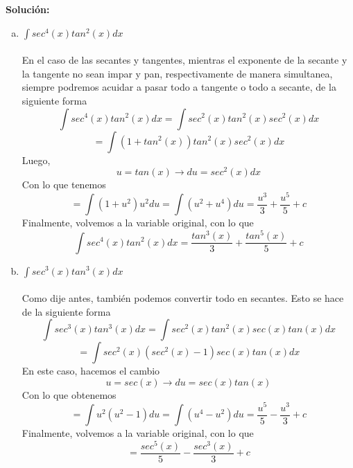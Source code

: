 \documentclass[12pt]{article}
\newenvironment{solucion}
{\begin{mdframed}[backgroundcolor=black!10]
		{\bf Solución:}\\
	}
	{
	\end{mdframed}
}
\newenvironment{preguntas}
{\begin{enumerate}\itemsep12pt
	}
	{
	\end{enumerate}
}
\newcommand{\ra}{\rightarrow}
\begin{document}
\begin{preguntas}
\begin{solucion}
\begin{enumerate}[a)]
\item $\displaystyle\int sec^4(x)tan^2(x)dx$\\\\
			En el caso de las secantes y tangentes, mientras el exponente de la secante y la tangente no sean impar y pan, respectivamente de manera simultanea, siempre podremos acuidar a pasar todo a tangente o todo a secante, de la siguiente forma
			$$\displaystyle\int sec^4(x)tan^2(x)dx
			=\displaystyle\int sec^2(x)tan^2(x)sec^2(x)dx$$
			$$=\displaystyle\int (1+tan^2(x))tan^2(x)sec^2(x)dx$$
			Luego,
			$$u = tan(x) \ra du = sec^2(x)dx$$
			Con lo que tenemos
			$$=\displaystyle\int (1+u^2)u^2du
			= \displaystyle\int (u^2+u^4)du
			= \dfrac{u^3}{3} + \dfrac{u^5}{5} + c$$
			Finalmente, volvemos a la variable original, con lo que
			$$\displaystyle\int sec^4(x)tan^2(x)dx = \dfrac{tan^3(x)}{3} + \dfrac{tan^5(x)}{5} + c$$
\item $\displaystyle\int sec^3(x)tan^3(x)dx$\\\\
			Como dije antes, también podemos convertir todo en secantes. Esto se hace de la siguiente forma
			$$\displaystyle\int sec^3(x)tan^3(x)dx
			= \displaystyle\int sec^2(x)tan^2(x)sec(x)tan(x)dx$$
			$$ = \displaystyle\int sec^2(x)(sec^2(x)-1)sec(x)tan(x)dx$$
			En este caso, hacemos el cambio
			$$u = sec(x) \ra du = sec(x)tan(x)$$
			Con lo que obtenemos
			$$ = \displaystyle\int u^2(u^2-1)du
			= \displaystyle\int (u^4-u^2)du
			= \dfrac{u^5}{5} - \dfrac{u^3}{3} + c$$
			Finalmente, volvemos a la variable original, con lo que
			$$= \dfrac{sec^5(x)}{5} - \dfrac{sec^3(x)}{3} + c$$	
\end{enumerate}
\end{solucion}
\end{preguntas}
\end{document}
